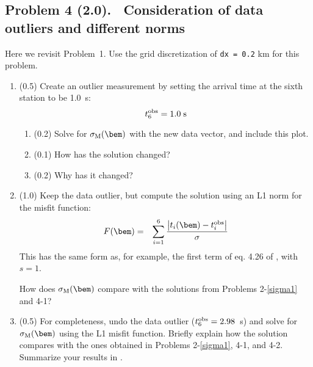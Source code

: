 \documentclass[11pt,titlepage,fleqn]{article}
\begin{document}

\pagebreak
\subsection*{Problem 4 (2.0). \ptag\ Consideration of data outliers and different norms}

Here we revisit Problem~1. Use the grid discretization of \verb+dx = 0.2+ km for this problem.

\begin{enumerate}
\item (0.5) Create an outlier measurement by setting the arrival time at the sixth station to be 1.0~s:
%
\begin{equation}
t_6^{\rm obs} = 1.0\;{\rm s}
\end{equation}

\begin{enumerate}
\item (0.2) Solve for $\sigma_{\rm M}(\bem)$ with the new data vector, and include this plot.
\item (0.1) How has the solution changed?
\item (0.2) Why has it changed?
\end{enumerate}

\item (1.0) Keep the data outlier, but compute the solution using an L1 norm for the misfit function:
%
\begin{eqnarray}
F(\bem) &=& \sum_{i=1}^6 \frac{\left| t_i(\bem) - t_i^{\rm obs}\right|}{\sigma}
\end{eqnarray}
%
This has the same form as, for example, the first term of eq. 4.26 of \citet{Tarantola2005}, with $s=1$.

How does $\sigma_{\rm M}(\bem)$ compare with the solutions from Problems 2-\ref{sigma1} and 4-1?

\item (0.5) For completeness, undo the data outlier ($t_6^{\rm obs} = 2.98$~s) and solve for $\sigma_{\rm M}(\bem)$ using the L1 misfit function.
Briefly explain how the solution compares with the ones obtained in Problems 2-\ref{sigma1}, 4-1, and 4-2.
Summarize your results in .

\end{enumerate}
\end{document}
